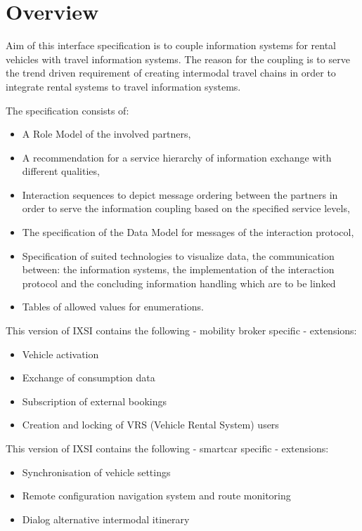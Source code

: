 \chapter{Overview}
\label{cha:Zusammenfassung}

Aim of this interface specification is to couple information systems for rental vehicles with travel information systems.
The reason for the coupling is to serve the trend driven requirement of creating intermodal travel chains in order to integrate rental systems to travel information systems.

The specification consists of:
\begin{itemize}
\item A Role Model of the involved partners,
\item A recommendation for a service hierarchy of information exchange with different qualities,
\item Interaction sequences to depict message ordering between the partners in order to serve the information coupling based on the specified service levels,
\item The specification of the Data Model for messages of the interaction protocol,
\item Specification of suited technologies to visualize data, the communication between: the information systems, the implementation of the interaction protocol and the concluding information handling which are to be linked
\item Tables of allowed values for enumerations.
\end{itemize}
This version of IXSI contains the following - mobility broker specific - extensions:
\begin{itemize}
	\item Vehicle activation 
	\item Exchange of consumption data 
	\item Subscription of external bookings
	\item Creation and locking of VRS (Vehicle Rental System) users
\end{itemize}
This version of IXSI contains the following -  smartcar specific - extensions:
\begin{itemize}
	\item Synchronisation of vehicle settings
	\item Remote configuration navigation system and route monitoring
	\item Dialog alternative intermodal itinerary
\end{itemize}
